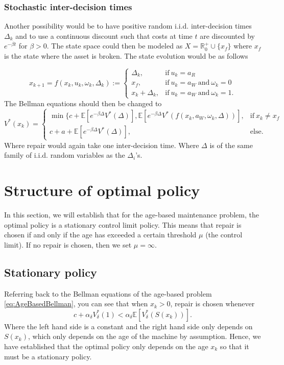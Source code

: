 \documentclass[a4paper]{thesis}
\theoremstyle{definition}
\begin{document}
\subsubsection{Stochastic inter-decision times}
Another possibility would be to have positive random i.i.d. inter-decision times $\Delta_k$ and to use a continuous discount such that costs at time $t$ are discounted by $e^{-\beta t}$ for $\beta>0$.
The state space could then be modeled as $X=\mathbb{R}_0^+\cup\{x_f\}$ where $x_f$ is the state where the asset is broken.
The state evolution would be as follows

$$
x_{k+1}=f(x_k,u_k,\omega_k,\Delta_k):=\begin{cases}
\Delta_k,&\text{if}\ u_k=a_R \\
x_f,&\text{if}\ u_k=a_W\ \text{and}\ \omega_k=0 \\
x_k+\Delta_k,&\text{if}\ u_k=a_W\ \text{and}\ \omega_k=1.
\end{cases}
$$
The Bellman equations should then be changed to
$$
V^*(x_k)=\begin{cases}
\min\{c+\mathbb{E}[e^{-\beta \Delta} V^*(\Delta)],\mathbb{E}[e^{-\beta \Delta} V^*(f(x_k,a_W,\omega_k,\Delta))],&\text{if}\ x_k\neq x_f \\
c+a+\mathbb{E}[e^{-\beta \Delta} V^*(\Delta)],&\text{else.}
\end{cases}
$$
Where repair would again take one inter-decision time. Where $\Delta$ is of the same family of i.i.d. random variables as the $\Delta_i$'s.

%
 \section{Structure of optimal policy}
In this section, we will establish that for the age-based maintenance problem, the optimal policy is a stationary control limit policy.
This means that repair is chosen if and only if the age has exceeded a certain threshold $\mu$ (the control limit).
If no repair is chosen, then we set $\mu=\infty$.

\subsection{Stationary policy}\label{section:AgeBasedStationaryPolicy}
Referring back to the Bellman equations of the age-based problem \eqref{eq:AgeBasedBellman}, you can see that when $x_k>0$, repair is chosen whenever
\[ c+\alpha_\delta V^*_\delta(1) <\alpha_\delta \mathbb{E}[V^*_\delta(S(x_k))]. \]
Where the left hand side is a constant and the right hand side only depends on $S(x_k)$, which only depends on the age of the machine by assumption.
Hence, we have established that the optimal policy only depends on the age $x_k$ so that it must be a stationary policy.
\end{document}
